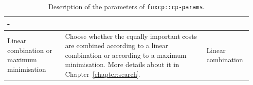 \begin{table}[!h]
\begin{adjustbox}{center}
\begin{tabular}{|m{}|m{}|m{}<{\centering}|}
          - \\ \hline
        \hline
        \cellcolor[HTML]{fff078}Linear combination or maximum minimisation &
          Choose whether the equally important costs are combined according to a linear combination or according to a maximum minimisation. More details about it in Chapter~\ref{chapter:search}.&
          Linear combination \\ \hline
        \end{tabular}
    \end{adjustbox}
    \caption{Description of the parameters of \texttt{fuxcp::cp-params}.}
    \label{tab:cp-params}
\end{table}

